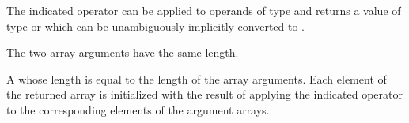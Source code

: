 \begin{itemdescr}
\pnum
\mandates
The indicated operator can be applied to operands of type  and returns
a value of type  or which can be unambiguously
implicitly converted to .

\pnum
\expects
The two array arguments have the same length.

\pnum
\returns
A  whose length
is equal to the length of the array arguments.
Each element of the returned
array is initialized with the result of applying the indicated
operator to the corresponding elements of the argument arrays.
\end{itemdescr}

%
%
%
%
%
%
%
%
